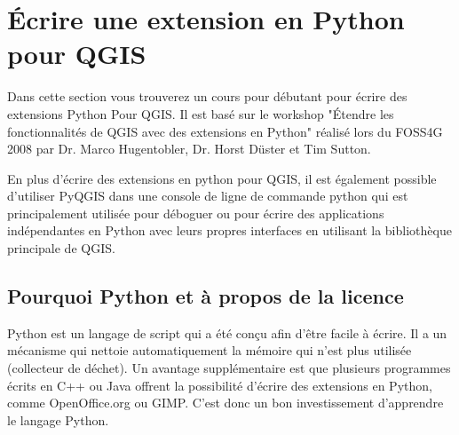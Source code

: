
\section{\'Ecrire une extension en Python pour QGIS}


Dans cette section vous trouverez un cours pour d\'ebutant pour \'ecrire des
extensions Python Pour QGIS. Il est bas\'e sur le workshop "\'Etendre les
fonctionnalit\'es de QGIS avec des extensions en Python" r\'ealis\'e lors du FOSS4G 2008
par  Dr. Marco Hugentobler, Dr. Horst D\"uster et Tim Sutton.

En plus d'\'ecrire des extensions en python pour QGIS, il est \'egalement possible
d'utiliser PyQGIS dans une console de ligne de commande python qui est
principalement utilis\'ee pour d\'eboguer ou pour \'ecrire des applications
ind\'ependantes en Python avec leurs propres interfaces en utilisant la
biblioth\`eque principale de QGIS.

\subsection{Pourquoi Python et \`a propos de la licence}

Python est un langage de script qui a \'et\'e con\c{c}u afin d'\^etre facile \`a \'ecrire. Il
a un m\'ecanisme qui nettoie automatiquement la m\'emoire qui n'est plus utilis\'ee
(collecteur de d\'echet). Un avantage suppl\'ementaire est que plusieurs programmes
\'ecrits en C++ ou Java offrent la possibilit\'e d'\'ecrire des extensions en Python,
comme OpenOffice.org ou GIMP. C'est donc un bon investissement d'apprendre le
langage Python.

